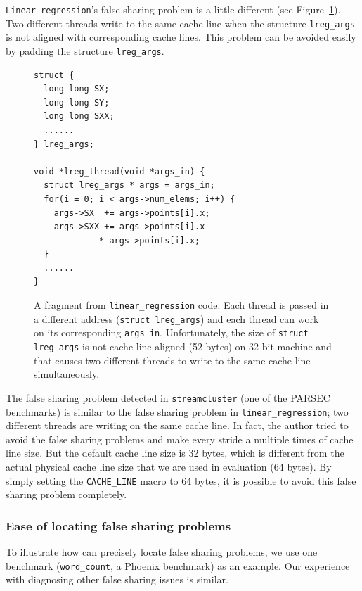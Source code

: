 \texttt{Linear\_regression}'s false sharing problem is a little different (see Figure~\ref{fig:linear_regression}). 
Two different threads write to the same cache line when the structure \texttt{lreg\_args} is not aligned with corresponding cache lines. This problem can be avoided easily by padding the structure \texttt{lreg\_args}.

\begin{figure}[!t]
\begin{lstlisting}
struct {
  long long SX;
  long long SY;
  long long SXX;
  ......
} lreg_args;

void *lreg_thread(void *args_in) {
  struct lreg_args * args = args_in;
  for(i = 0; i < args->num_elems; i++) {
    args->SX  += args->points[i].x;
    args->SXX += args->points[i].x 
   	         * args->points[i].x;
  }
  ......	
}
\end{lstlisting}
\caption{A fragment from \texttt{linear\_regression} code. Each thread is passed in a different address (\texttt{struct lreg\_args}) and each thread can work on its corresponding \texttt{args\_in}. 
Unfortunately, the size of \texttt{struct lreg\_args} is not cache line aligned (52 bytes) on 32-bit machine and that causes two different threads to write to the same cache line simultaneously. 
\label{fig:linear_regression}}
\end{figure}

The false sharing problem detected in \texttt{streamcluster} (one of the PARSEC benchmarks) is similar to the false sharing problem in \texttt{linear\_regression}; two different threads are writing on the same cache line.  In fact, the author tried to avoid the false sharing problems and make every stride a multiple times of cache line size. But the default cache line size is 32 bytes, which is different from the actual physical cache line size that we are used in evaluation (64 bytes).  By simply setting the \texttt{CACHE\_LINE} macro to 64 bytes, it is possible to avoid this false sharing problem completely.


\subsubsection{Ease of locating false sharing problems}

\label{sec:fsfixexample}

To illustrate how \sheriffdetect{} can precisely locate false sharing problems, we use one benchmark (\texttt{word\_count}, a Phoenix benchmark) as an example. Our experience with diagnosing other false sharing issues is similar.

